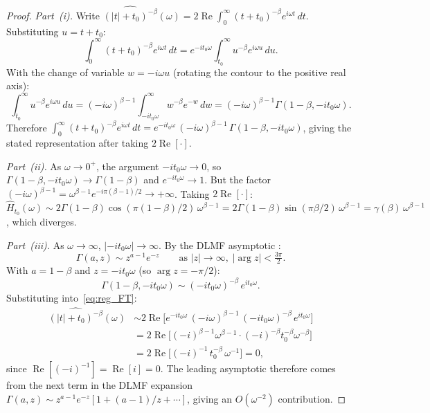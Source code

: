 \documentclass[12pt]{article}
\theoremstyle{definition}
\theoremstyle{remark}
\begin{document}
\begin{proof}
\emph{Part~(i).}
Write $\widehat{(|t|+t_0)^{-\beta}}(\omega) = 2\operatorname{Re}\int_0^\infty (t+t_0)^{-\beta}e^{i\omega t}\,dt$.
Substituting $u = t+t_0$:
\[
  \int_0^\infty (t+t_0)^{-\beta}e^{i\omega t}\,dt
  = e^{-it_0\omega}\int_{t_0}^\infty u^{-\beta}e^{i\omega u}\,du.
\]
With the change of variable $w = -i\omega u$ (rotating the contour to the positive
real axis):
\[
  \int_{t_0}^\infty u^{-\beta}e^{i\omega u}\,du
  = (-i\omega)^{\beta-1}\int_{-it_0\omega}^\infty w^{-\beta}e^{-w}\,dw
  = (-i\omega)^{\beta-1}\Gamma(1-\beta,-it_0\omega).
\]
Therefore
$\int_0^\infty (t+t_0)^{-\beta}e^{i\omega t}\,dt
= e^{-it_0\omega}\,(-i\omega)^{\beta-1}\,\Gamma(1-\beta,-it_0\omega)$,
giving the stated representation after taking $2\operatorname{Re}[\cdot]$.

\smallskip\noindent
\emph{Part~(ii).}
As $\omega\to 0^+$, the argument $-it_0\omega\to 0$, so
$\Gamma(1-\beta,-it_0\omega)\to\Gamma(1-\beta)$ and $e^{-it_0\omega}\to 1$.
But the factor $(-i\omega)^{\beta-1} = \omega^{\beta-1}e^{-i\pi(\beta-1)/2}
\to +\infty$. Taking $2\operatorname{Re}[\cdot]$:
$\hat{H}_{t_0}(\omega) \sim 2\Gamma(1-\beta)\cos(\pi(1-\beta)/2)\,\omega^{\beta-1}
= 2\Gamma(1-\beta)\sin(\pi\beta/2)\,\omega^{\beta-1}
= \gamma(\beta)\,\omega^{\beta-1}$, which diverges.

\smallskip\noindent
\emph{Part~(iii).}
As $\omega\to\infty$, $|{-it_0\omega}|\to\infty$.  By the DLMF asymptotic
\cite[Eq.~8.11.2]{DLMF}:
\[
  \Gamma(a,z) \sim z^{a-1}e^{-z}\qquad\text{as }|z|\to\infty,\;|\arg z|<\tfrac{3\pi}{2}.
\]
With $a=1-\beta$ and $z=-it_0\omega$ (so $\arg z = -\pi/2$):
\[
  \Gamma(1-\beta,-it_0\omega) \sim (-it_0\omega)^{-\beta}\,e^{it_0\omega}.
\]
Substituting into~\eqref{eq:reg_FT}:
\begin{align*}
  \widehat{(|t|+t_0)^{-\beta}}(\omega)
  &\sim 2\operatorname{Re}\bigl[e^{-it_0\omega}\,
    (-i\omega)^{\beta-1}\,(-it_0\omega)^{-\beta}\,e^{it_0\omega}\bigr]\\
  &= 2\operatorname{Re}\bigl[(-i)^{\beta-1}\omega^{\beta-1}\cdot
    (-i)^{-\beta}t_0^{-\beta}\omega^{-\beta}\bigr]\\
  &= 2\operatorname{Re}\bigl[(-i)^{-1}\,t_0^{-\beta}\,\omega^{-1}\bigr]
  = 0,
\end{align*}
since $\operatorname{Re}[(-i)^{-1}] = \operatorname{Re}[i] = 0$. The leading
asymptotic therefore comes from the next term in the DLMF expansion
$\Gamma(a,z) \sim z^{a-1}e^{-z}[1 + (a-1)/z + \cdots]$, giving an
$O(\omega^{-2})$ contribution.
\end{proof}
\end{document}
